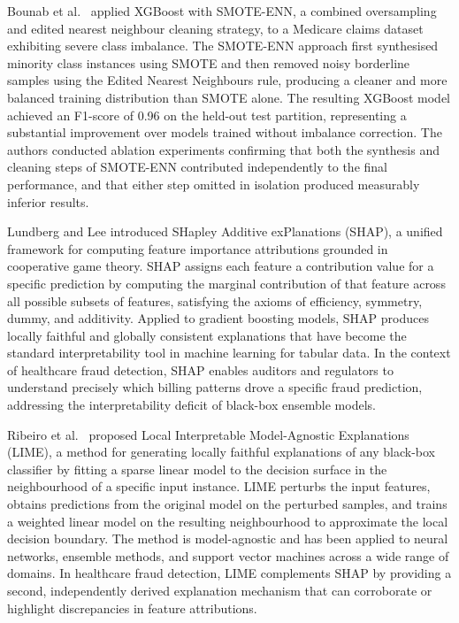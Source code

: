 Bounab et al.\ \cite{bounab2024} applied XGBoost with SMOTE-ENN, a combined oversampling and edited nearest neighbour cleaning strategy, to a Medicare claims dataset exhibiting severe class imbalance. The SMOTE-ENN approach first synthesised minority class instances using SMOTE and then removed noisy borderline samples using the Edited Nearest Neighbours rule, producing a cleaner and more balanced training distribution than SMOTE alone. The resulting XGBoost model achieved an F1-score of 0.96 on the held-out test partition, representing a substantial improvement over models trained without imbalance correction. The authors conducted ablation experiments confirming that both the synthesis and cleaning steps of SMOTE-ENN contributed independently to the final performance, and that either step omitted in isolation produced measurably inferior results.

Lundberg and Lee \cite{lundberg2017} introduced SHapley Additive exPlanations (SHAP), a unified framework for computing feature importance attributions grounded in cooperative game theory. SHAP assigns each feature a contribution value for a specific prediction by computing the marginal contribution of that feature across all possible subsets of features, satisfying the axioms of efficiency, symmetry, dummy, and additivity. Applied to gradient boosting models, SHAP produces locally faithful and globally consistent explanations that have become the standard interpretability tool in machine learning for tabular data. In the context of healthcare fraud detection, SHAP enables auditors and regulators to understand precisely which billing patterns drove a specific fraud prediction, addressing the interpretability deficit of black-box ensemble models.

Ribeiro et al.\ \cite{ribeiro2016} proposed Local Interpretable Model-Agnostic Explanations (LIME), a method for generating locally faithful explanations of any black-box classifier by fitting a sparse linear model to the decision surface in the neighbourhood of a specific input instance. LIME perturbs the input features, obtains predictions from the original model on the perturbed samples, and trains a weighted linear model on the resulting neighbourhood to approximate the local decision boundary. The method is model-agnostic and has been applied to neural networks, ensemble methods, and support vector machines across a wide range of domains. In healthcare fraud detection, LIME complements SHAP by providing a second, independently derived explanation mechanism that can corroborate or highlight discrepancies in feature attributions.

